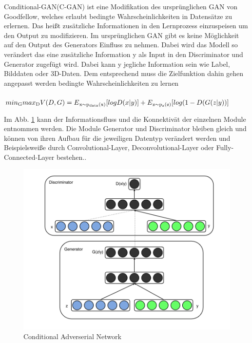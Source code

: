 \documentclass{llncs}
\begin{document}
Conditional-GAN(C-GAN) ist eine Modifikation des ursprünglichen GAN von Goodfellow, welches erlaubt bedingte Wahrscheinlichkeiten in Datensätze zu erlernen. Das heißt zusätzliche Informationen in den Lernprozess einzuspeisen um den Output zu modifizieren. Im ursprünglichen GAN gibt es keine Möglichkeit auf den Output des Generators Einfluss zu nehmen. Dabei wird das Modell so verändert das eine zusätzliche Information y als Input in den Discriminator und Generator zugefügt wird. Dabei kann y jegliche Information sein wie Label, Bilddaten oder 3D-Daten. Dem entsprechend muss die Zielfunktion dahin gehen angepasst werden bedingte Wahrscheinlichkeiten zu lernen
\\\\
\begin{math}
min\textsubscript{G} max\textsubscript{D}V(D,G)=E\textsubscript{x$\sim$p\textsubscript{data}(x)}[logD(x|y)]  + E\textsubscript{z$\sim$p\textsubscript{z}(z)}[log(1-D(G(z|y))]
\\\\             
\end{math}

Im Abb. \ref{fig:Bild20} kann der Informationsfluss und die Konnektivät der einzelnen Module entnommen werden. Die Module Generator und Discriminator bleiben gleich und können von ihren Aufbau für die jeweiligen Datentyp verändert werden und Beispielsweiße durch Convolutional-Layer, Deconvolutional-Layer oder Fully-Connected-Layer bestehen.\cite{dcgan}.

\begin{figure}[htbp] 
	\centering
	\includegraphics[width=1.2\textwidth]{cgan.png}
	\caption{Conditional Adverserial Network}
	\label{fig:Bild20}
\end{figure}
\end{document}
